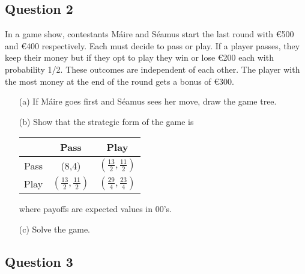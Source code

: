 \documentclass[12pt]{article}
\begin{document}
       \subsection*{Question 2}


       \item In a game show, contestants M\'{a}ire and S\'{e}amus start the last round with \euro{500} and \euro{400} respectively. Each must decide to pass or play. If a player passes, they keep their money but if they opt to play they win or lose \euro{200} each with probability 1/2. These outcomes are independent of each other. The player with the most money at the end of the round gets a bonus of \euro{300}.
        \begin{enumerate}
        \item[(a)] If M\'{a}ire goes first and S\'{e}amus sees her move, draw the game tree. 
        \item[(b)] Show that the strategic form of the game is

        \begin{center}

        \begin{tabular}{|c|c|c|}
        \hline
        & Pass         &Play       \\
        \hline
        Pass & (8,4) &$\left(\frac{13}{2}, \frac{11}{2}\right)$  \\
        \hline
        Play & $\left(\frac{13}{2}, \frac{11}{2}\right)$& $\left(\frac{29}{4}, \frac{23}{4}\right)$ \\
        \hline
        \end{tabular}
        \end{center}
        where payoffs are expected values in 00's. 

        \item[(c)] Solve the game. 
        \end{enumerate}



       \subsection*{Question 3}

\end{document}
